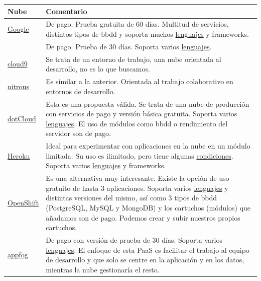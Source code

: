 \begin{table}[H]
	\centering
	\begin{tabular}{p{2cm} p{8cm}}
	\hline
	\textbf{Nube} & \textbf{Comentario} \\
	\hline \hline
	\href{https://cloud.google.com/free-trial/?hl=es&_ga=1.261030148.846668794.1427305506}{Google} & De pago. Prueba gratuita de 60 días. Multitud de servicios, distintos tipos de bbdd y soporta muchos \href{https://cloud.google.com/launcher/?hl=es}{lenguajes} y frameworks. \\
	\hline
	\cite{URL:Azure} & De pago. Prueba de 30 días. Soporta varios \href{https://tryappservice.azure.com/}{lenguajes}. \\
	\hline
	\href{https://c9.io/}{cloud9} & Se trata de un entorno de trabajo, una nube orientada al desarrollo, no es lo que buscamos. \\
	\hline
	\href{https://www.nitrous.io/}{nitrous} & Es similar a la anterior. Orientada al trabajo colaborativo en entornos de desarrollo. \\
	\hline
	\href{https://www.dotcloud.com/}{dotCloud} & Esta es una propuesta válida. Se trata de una nube de producción con servicios de pago y versión básica gratuita. Soporta varios \href{https://www.dotcloud.com/dev-center/guides}{lenguajes}. El uso de módulos como bbdd o rendimiento del servidor son de pago. \\
	\hline
	\href{https://www.heroku.com/}{Heroku} & Ideal para experimentar con aplicaciones en la nube en un módulo limitada. Su uso es ilimitado, pero tiene algunas \href{https://www.heroku.com/pricing}{condiciones}. Soporta varios \href{https://devcenter.heroku.com/categories/language-support}{lenguajes} y frameworks. \\
	\hline
	\href{https://www.openshift.com/}{OpenShift} & Es una alternativa muy interesante. Existe la opción de uso gratuito de hasta 3 aplicaciones. Soporta varios \href{https://www.openshift.com/promotions/try-openshift?sc_cid=70160000000UJArAAO&gclid=CMqo54DUy8cCFSMcwwodxLoGGQ}{lenguajes} y distintas versiones del mismo, así como 3 tipos de bbdd (PostgreSQL, MySQL y MongoDB) y los cartuchos (módulos) que añadamos son de pago. Podemos crear y subir nuestros propios cartuchos. \\
	\hline
	\href{https://www.appfog.com/}{appfog} & De pago con versión de prueba de 30 días. Soporta varios \href{https://www.ctl.io/appfog/}{lenguajes}. El enfoque de esta PaaS es facilitar el trabajo al equipo de desarrollo y que solo se centre en la aplicación y en los datos, mientras la nube gestionaría el resto. \\

\end{tabular}
\end{table}
